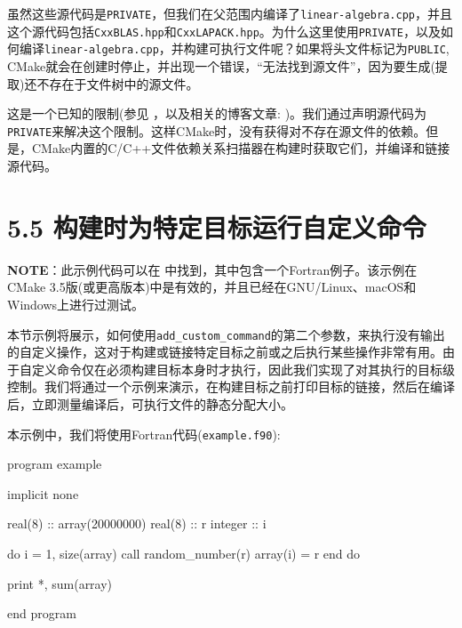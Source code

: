 虽然这些源代码是\texttt{PRIVATE}，但我们在父范围内编译了\texttt{linear-algebra.cpp}，并且这个源代码包括\texttt{CxxBLAS.hpp}和\texttt{CxxLAPACK.hpp}。为什么这里使用\texttt{PRIVATE}，以及如何编译\texttt{linear-algebra.cpp}，并构建可执行文件呢？如果将头文件标记为\texttt{PUBLIC}, CMake就会在创建时停止，并出现一个错误，“无法找到源文件”，因为要生成(提取)还不存在于文件树中的源文件。

这是一个已知的限制(参见 ，以及相关的博客文章: )。我们通过声明源代码为\texttt{PRIVATE}来解决这个限制。这样CMake时，没有获得对不存在源文件的依赖。但是，CMake内置的C/C++文件依赖关系扫描器在构建时获取它们，并编译和链接源代码。


\section{5.5 构建时为特定目标运行自定义命令}

\begin{myInfoBox}
\textbf{NOTE}：此示例代码可以在  中找到，其中包含一个Fortran例子。该示例在CMake 3.5版(或更高版本)中是有效的，并且已经在GNU/Linux、macOS和Windows上进行过测试。
\end{myInfoBox}

本节示例将展示，如何使用\texttt{add\_custom\_command}的第二个参数，来执行没有输出的自定义操作，这对于构建或链接特定目标之前或之后执行某些操作非常有用。由于自定义命令仅在必须构建目标本身时才执行，因此我们实现了对其执行的目标级控制。我们将通过一个示例来演示，在构建目标之前打印目标的链接，然后在编译后，立即测量编译后，可执行文件的静态分配大小。


本示例中，我们将使用Fortran代码(\texttt{example.f90}):

\begin{codebox}[fortran]
program example

  implicit none
  
  real(8) :: array(20000000)
  real(8) :: r
  integer :: i
  
  do i = 1, size(array)
    call random_number(r)
    array(i) = r
  end do
  
  print *, sum(array)
  
end program
\end{codebox}

